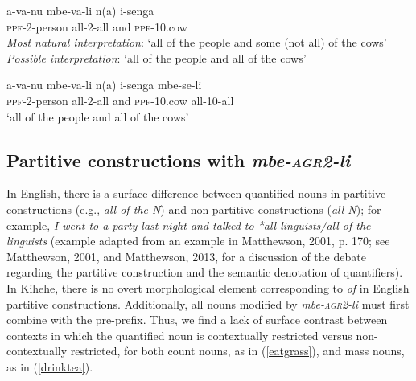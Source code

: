 \documentclass[letterpaper, 12pt]{article}
\begin{document}
\begin{exe}
\singlespacing
\ex \begin{xlist}

\ex \gll a-va-nu mbe-va-li n(a) i-senga \\
\textsc{ppf}-2-person all-2-all and \textsc{ppf}-10.cow \\
\textit{Most natural interpretation}: `all of the people and some (not all) of the cows' \\
\textit{Possible interpretation}: `all of the people and all of the cows' \\

\vspace{2mm}

\ex \gll a-va-nu mbe-va-li n(a) i-senga mbe-se-li \\
\textsc{ppf}-2-person all-2-all and \textsc{ppf}-10.cow all-10-all \\
`all of the people and all of the cows' 

\end{xlist}
\end{exe}

\subsection{Partitive constructions with \emph{mbe-\textsc{agr2}-li}}

In English, there is a surface difference between quantified nouns in partitive constructions (e.g., \textit{all of the N}) and non-partitive constructions (\textit{all N}); for example, \textit{I went to a party last night and talked to *all linguists/all of the linguists} (example adapted from an example in Matthewson, 2001, p. 170; see Matthewson, 2001, and Matthewson, 2013, for a discussion of the debate regarding the partitive construction and the semantic denotation of quantifiers). In Kihehe, there is no overt morphological element corresponding to \textit{of} in English partitive constructions. Additionally, all nouns modified by \emph{mbe-\textsc{agr2}-li} must first combine with the pre-prefix.  Thus, we find a lack of surface contrast between contexts in which the quantified noun is contextually restricted versus non-contextually restricted, for both count nouns, as in (\ref{eatgrass}), and mass nouns, as in (\ref{drinktea}).
\end{document}
